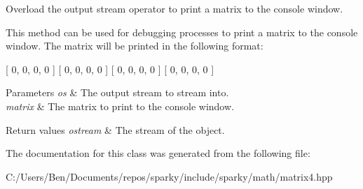 Overload the output stream operator to print a matrix to the console window. 

This method can be used for debugging processes to print a matrix to the console window. The matrix will be printed in the following format\+:

\mbox{[} 0, 0, 0, 0 \mbox{]} \mbox{[} 0, 0, 0, 0 \mbox{]} \mbox{[} 0, 0, 0, 0 \mbox{]} \mbox{[} 0, 0, 0, 0 \mbox{]}


\begin{DoxyParams}{Parameters}
{\em os} & The output stream to stream into. \\
\hline
{\em matrix} & The matrix to print to the console window.\\
\hline
\end{DoxyParams}

\begin{DoxyRetVals}{Return values}
{\em ostream} & The stream of the object. \\
\hline
\end{DoxyRetVals}


The documentation for this class was generated from the following file\+:\begin{DoxyCompactItemize}
\item 
C\+:/\+Users/\+Ben/\+Documents/repos/sparky/include/sparky/math/matrix4.\+hpp\end{DoxyCompactItemize}
